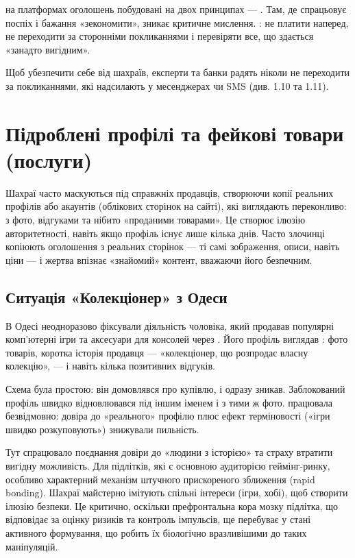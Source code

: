  на платформах оголошень побудовані на двох принципах — . Там, де спрацьовує поспіх і бажання «зекономити», зникає критичне мислення. : не платити наперед, не переходити за сторонніми покликаннями і перевіряти все, що здається «занадто вигідним».

Щоб убезпечити себе від шахраїв, експерти та банки радять ніколи не переходити за покликаннями, які надсилають у месенджерах чи SMS (див. 1.10 та 1.11).

\newpage

\chapter{Підроблені профілі та фейкові товари (послуги)}

Шахраї часто маскуються під справжніх продавців, створюючи копії реальних профілів або акаунтів (облікових сторінок на сайті), які виглядають переконливо: з фото, відгуками та нібито «проданими товарами». Це створює ілюзію авторитетності, навіть якщо профіль існує лише кілька днів. Часто злочинці копіюють оголошення з реальних сторінок — ті самі зображення, описи, навіть ціни — і жертва впізнає «знайомий» контент, вважаючи його безпечним.

\vspace{0.3cm}

\section{Ситуація «Колекціонер» з Одеси}

В Одесі неодноразово фіксували діяльність чоловіка, який продавав популярні комп'ютерні ігри та аксесуари для консолей через . Його профіль виглядав : фото товарів, коротка історія продавця — «колекціонер, що розпродає власну колекцію», — і навіть кілька позитивних відгуків.

Схема була простою: він домовлявся про купівлю,  і одразу зникав. Заблокований профіль швидко відновлювався під іншим іменем і з тими ж фото.  працювала безвідмовно: довіра до «реального» профілю плюс ефект терміновості («ігри швидко розкуповують») знижували пильність.

\newpage

 Тут спрацювало поєднання довіри до «людини з історією» та страху втратити вигідну можливість. Для підлітків, які є основною аудиторією геймінг-ринку, особливо характерний механізм штучного прискореного зближення (rapid bonding). Шахраї майстерно імітують спільні інтереси (ігри, хобі), щоб створити ілюзію безпеки. Це критично, оскільки префронтальна кора мозку підлітка, що відповідає за оцінку ризиків та контроль імпульсів, ще перебуває у стані активного формування, що робить їх біологічно вразливішими до таких маніпуляцій.

